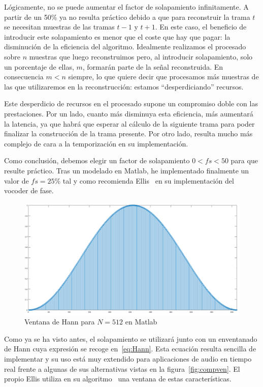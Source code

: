 Lógicamente, no se puede aumentar el factor de solapamiento infinitamente. A partir de un 50\% ya no resulta práctico debido a que para reconstruir la trama $t$ se necesitan muestras de las tramas $t-1$ y $t+1$. En este caso, el beneficio de introducir este solapamiento es menor que el coste que hay que pagar: la disminución de la eficiencia del algoritmo. Idealmente realizamos el procesado sobre $n$ muestras que luego reconstruimos pero, al introducir solapamiento, solo un porcentaje de ellas, $m$, formarán parte de la señal reconstruida. En consecuencia $m < n$ siempre, lo que quiere decir que procesamos más muestras de las que utilizaremos en la reconstrucción: estamos ``desperdiciando'' recursos.

Este desperdicio de recursos en el procesado supone un compromiso doble con las prestaciones. Por un lado, cuanto más disminuya esta eficiencia, más aumentará la latencia, ya que habrá que esperar al cálculo de la siguiente trama para poder finalizar la construcción de la trama presente. Por otro lado, resulta mucho más complejo de cara a la temporización en su implementación. 

Como conclusión, debemos elegir un factor de solapamiento $0 < fs < 50$ para que resulte práctico. Tras un modelado en Matlab, he implementado finalmente un valor de $fs = 25\%$ tal y como recomienda Ellis~\cite{Ellis} en su implementación del vocoder de fase.

\begin{figure}[!b]
\begin{center}
\includegraphics[width=15cm]{img/ventana_utilizada.png}
\caption{\label{fig:used_win}Ventana de Hann para $N = 512$ en Matlab}
\end{center}
\end{figure}

Como ya se ha visto antes, el solapamiento se utilizará junto con un enventanado de Hann cuya expresión se recoge en~\ref{eq:Hann}. Esta ecuación resulta sencilla de implementar y su uso está muy extendido para aplicaciones de audio en tiempo real frente a algunas de sus alternativas vistas en la figura~\ref{fig:compven}. El propio Ellis utiliza en su algoritmo~\cite{Ellis} una ventana de estas características.

